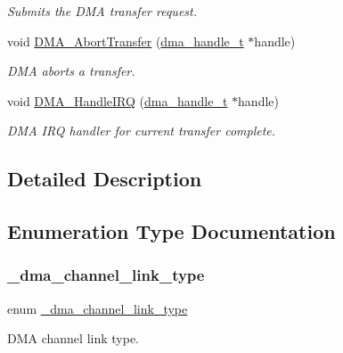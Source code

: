 \begin{DoxyCompactItemize}
\begin{DoxyCompactList}\small\item\em Submits the D\+MA transfer request. \end{DoxyCompactList}\item 
void \mbox{\hyperlink{group__dma_ga3c61d6121d88d2cdf287fc1cd72912fd}{D\+M\+A\+\_\+\+Abort\+Transfer}} (\mbox{\hyperlink{group__dma_gac4a65788d7e5762d16a41a50b2cd7956}{dma\+\_\+handle\+\_\+t}} $\ast$handle)
\begin{DoxyCompactList}\small\item\em D\+MA aborts a transfer. \end{DoxyCompactList}\item 
void \mbox{\hyperlink{group__dma_ga3484c491bd7943623d1d8fdc013c7e97}{D\+M\+A\+\_\+\+Handle\+I\+RQ}} (\mbox{\hyperlink{group__dma_gac4a65788d7e5762d16a41a50b2cd7956}{dma\+\_\+handle\+\_\+t}} $\ast$handle)
\begin{DoxyCompactList}\small\item\em D\+MA I\+RQ handler for current transfer complete. \end{DoxyCompactList}\end{DoxyCompactItemize}


\subsection{Detailed Description}


\subsection{Enumeration Type Documentation}
\mbox{\label{group__dma_ga741c3a62f7938bf691a12d6304f0247c}} 
\subsubsection{\texorpdfstring{\_dma\_channel\_link\_type}{\_dma\_channel\_link\_type}}
{\footnotesize\ttfamily enum \mbox{\hyperlink{group__dma_ga741c3a62f7938bf691a12d6304f0247c}{\+\_\+dma\+\_\+channel\+\_\+link\+\_\+type}}}



D\+MA channel link type. 

